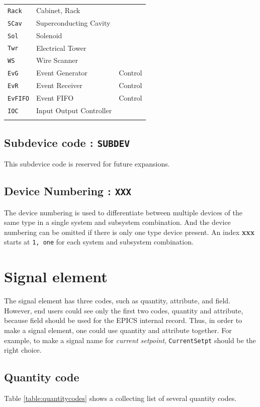 \documentclass[11pt
  , a4paper
  , article
  , oneside
]{memoir}
\begin{document}
\begin{center}
\begin{longtable}[t]{>{\raggedleft\arraybackslash}p{3cm} |p{7cm}| p{3cm}}
\texttt{Rack}  & Cabinet, Rack & \\
\texttt{SCav}  & Superconducting Cavity & \\
\texttt{Sol}   & Solenoid & \\
\texttt{Twr}   & Electrical Tower & \\
\texttt{WS}    & Wire Scanner & \\
\texttt{EvG}   & Event Generator & Control \\
\texttt{EvR}   & Event Receiver & Control \\
\texttt{EvFIFO} & Event FIFO & Control \\
\texttt{IOC}    & Input Output Controller \\
&\\
\end{longtable}
\end{center}

\section{Subdevice code : \texttt{SUBDEV}}
This subdevice code is reserved for future expansions.

\section{Device Numbering : \texttt{XXX}}
The device numbering is used to differentiate between multiple devices of the same type in a single system and subsystem combination. And the device numbering can be omitted if there is only one type device present. An index \textbf{xxx} starts at \texttt{1, one} for each system and subsystem combination. 

\clearpage
\chapter{Signal element}
The signal element has three codes, such as quantity, attribute, and field. However, end users could see only the first two codes, quantity and attribute, because field should be used for the EPICS internal record. Thus, in order to make a signal element, one could use quantity and attribute together. For example, to make a signal name for \textit{current setpoint}, \texttt{CurrentSetpt} should be the right choice. 

\section{Quantity code}
Table \ref{table:quantitycodes} shows a collecting list of several quantity codes. 
\end{document}
